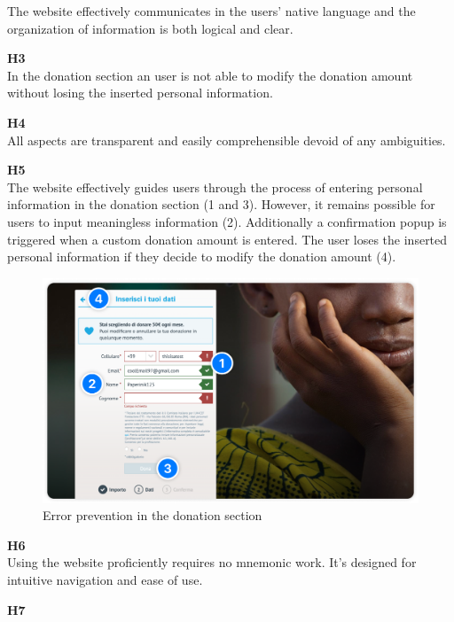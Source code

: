 \begin{description}
    The website effectively communicates in the users' native language and the organization of information is both logical and clear.
    \newpage
    \item {\textbf{H3} \color{unicefGray}{User control and freedom}}\\
    In the donation section an user is not able to modify the donation amount without losing the inserted personal information.
    \item {\textbf{H4} \color{unicefGray}{Consistency and standards}}\\
    All aspects are transparent and easily comprehensible devoid of any ambiguities.
    \item {\textbf{H5} \color{unicefGray}{Error prevention}}\\
    The website effectively guides users through the process of entering personal information in the donation section (1 and 3). 
    However, it remains possible for users to input meaningless information (2).
    Additionally a confirmation popup is triggered when a custom donation amount is entered.
    The user loses the inserted personal information if they decide to modify the donation amount (4).
    \begin{figure}[h]
        \centering
        \includegraphics[scale=0.20]{Resources/Dario/donation}
        \caption{Error prevention in the donation section}
    \end{figure}
    \item {\textbf{H6} \color{unicefGray}{Recognition rather than recall}}\\
    Using the website proficiently requires no mnemonic work. It's designed for intuitive navigation and ease of use.
    \item {\textbf{H7} \color{unicefGray}{Flexibility and efficiency of use}}\\

\end{description}
